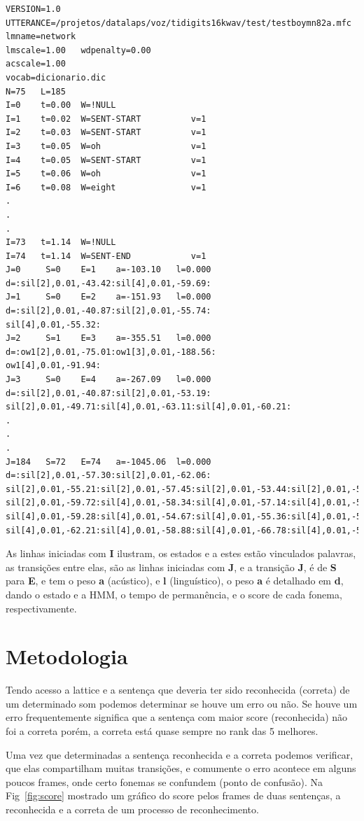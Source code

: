 \documentclass[a4paper]{article}
\begin{document}
\begin{verbatim}
VERSION=1.0
UTTERANCE=/projetos/datalaps/voz/tidigits16kwav/test/testboymn82a.mfc
lmname=network
lmscale=1.00   wdpenalty=0.00  
acscale=1.00  
vocab=dicionario.dic
N=75   L=185  
I=0    t=0.00  W=!NULL               
I=1    t=0.02  W=SENT-START          v=1  
I=2    t=0.03  W=SENT-START          v=1  
I=3    t=0.05  W=oh                  v=1  
I=4    t=0.05  W=SENT-START          v=1  
I=5    t=0.06  W=oh                  v=1  
I=6    t=0.08  W=eight               v=1  
.
.
.
I=73   t=1.14  W=!NULL               
I=74   t=1.14  W=SENT-END            v=1  
J=0     S=0    E=1    a=-103.10   l=0.000   d=:sil[2],0.01,-43.42:sil[4],0.01,-59.69:
J=1     S=0    E=2    a=-151.93   l=0.000   d=:sil[2],0.01,-40.87:sil[2],0.01,-55.74:
sil[4],0.01,-55.32:
J=2     S=1    E=3    a=-355.51   l=0.000   d=:ow1[2],0.01,-75.01:ow1[3],0.01,-188.56:
ow1[4],0.01,-91.94:
J=3     S=0    E=4    a=-267.09   l=0.000   d=:sil[2],0.01,-40.87:sil[2],0.01,-53.19:
sil[2],0.01,-49.71:sil[4],0.01,-63.11:sil[4],0.01,-60.21:
.
.
.
J=184   S=72   E=74   a=-1045.06  l=0.000   d=:sil[2],0.01,-57.30:sil[2],0.01,-62.06:
sil[2],0.01,-55.21:sil[2],0.01,-57.45:sil[2],0.01,-53.44:sil[2],0.01,-56.24:
sil[2],0.01,-59.72:sil[4],0.01,-58.34:sil[4],0.01,-57.14:sil[4],0.01,-59.52:
sil[4],0.01,-59.28:sil[4],0.01,-54.67:sil[4],0.01,-55.36:sil[4],0.01,-53.63:
sil[4],0.01,-62.21:sil[4],0.01,-58.88:sil[4],0.01,-66.78:sil[4],0.01,-57.83:
\end{verbatim}

As linhas iniciadas com \textbf{I} ilustram, os estados e a estes estão vinculados
palavras, as transições entre elas, são as linhas iniciadas com \textbf{J}, e a
transição \textbf{J}, é de \textbf{S} para \textbf{E}, e tem o peso \textbf{a} (acústico),
e \textbf{l} (linguístico), o peso \textbf{a} é detalhado em \textbf{d}, dando
o estado e a HMM, o tempo de permanência, e o score de cada fonema, respectivamente.

\section{Metodologia}

Tendo acesso a lattice e a sentença que deveria ter sido reconhecida (correta) de um
determinado som podemos determinar se houve um erro ou não. Se houve um erro
frequentemente significa que a sentença com maior score (reconhecida) não foi a correta 
porém, a correta está quase sempre no rank das 5 melhores.

Uma vez que determinadas a sentença reconhecida e a correta podemos verificar, que
elas compartilham muitas transições, e comumente o erro acontece em alguns poucos
frames, onde certo fonemas se confundem (ponto de confusão). Na Fig~\ref{fig:score} mostrado
um gráfico do score pelos frames de duas sentenças, a reconhecida e a correta de um processo
de reconhecimento.
\end{document}
